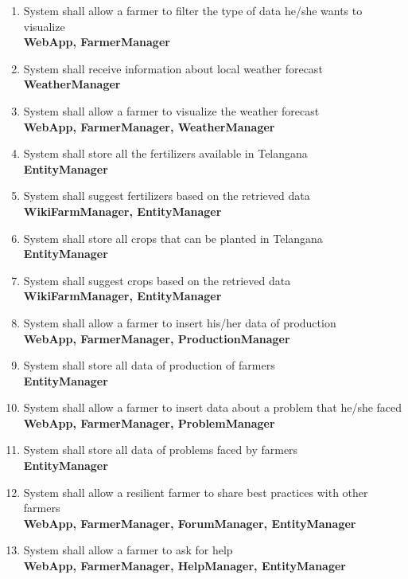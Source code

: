 \begin{enumerate} [label=\textbf{R.\arabic*}]
        \textbf{EntityManager}
    \item System shall allow a farmer to filter the type of data he/she wants to visualize\\
        \textbf{WebApp, FarmerManager}
    \item System shall receive information about local weather forecast\\
        \textbf{WeatherManager}
    \item System shall allow a farmer to visualize the weather forecast\\
        \textbf{WebApp, FarmerManager, WeatherManager}
    \item System shall store all the fertilizers available in Telangana\\
        \textbf{EntityManager}
    \item System shall suggest fertilizers based on the retrieved data\\
        \textbf{WikiFarmManager, EntityManager}
    \item System shall store all crops that can be planted in Telangana\\
        \textbf{EntityManager}
    \item System shall suggest crops based on the retrieved data\\
        \textbf{WikiFarmManager, EntityManager}
    \item System shall allow a farmer to insert his/her data of production\\
        \textbf{WebApp, FarmerManager, ProductionManager}
    \item System shall store all data of production of farmers\\
        \textbf{EntityManager}
    \item System shall allow a farmer to insert data about a problem that he/she faced\\
        \textbf{WebApp, FarmerManager, ProblemManager}
    \item System shall store all data of problems faced by farmers\\
        \textbf{EntityManager}
    \item System shall allow a resilient farmer to share best practices with other farmers\\
        \textbf{WebApp, FarmerManager, ForumManager, EntityManager}
    \item System shall allow a farmer to ask for help\\
        \textbf{WebApp, FarmerManager, HelpManager, EntityManager}

\end{enumerate}
